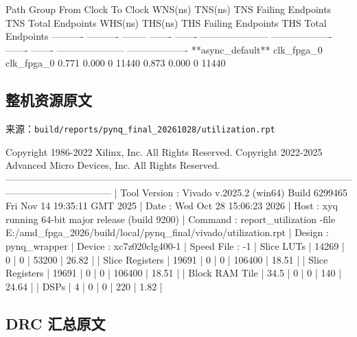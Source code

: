 \begin{codeblock}
Path Group         From Clock         To Clock               WNS(ns)      TNS(ns)  TNS Failing Endpoints  TNS Total Endpoints      WHS(ns)      THS(ns)  THS Failing Endpoints  THS Total Endpoints  
----------         ----------         --------               -------      -------  ---------------------  -------------------      -------      -------  ---------------------  -------------------  
**async_default**  clk_fpga_0         clk_fpga_0               0.771        0.000                      0                11440        0.873        0.000                      0                11440
\end{codeblock}

\Needspace{224pt}

\subsection{整机资源原文}

来源：\texttt{build/\allowbreak{}reports/\allowbreak{}pynq\_\allowbreak{}final\_\allowbreak{}20261028/\allowbreak{}utilization.\allowbreak{}rpt}

\begin{codeblock}[samepage=true]
Copyright 1986-2022 Xilinx, Inc. All Rights Reserved. Copyright 2022-2025 Advanced Micro Devices, Inc. All Rights Reserved.
---------------------------------------------------------------------------------------------------------------------------------------------
| Tool Version : Vivado v.2025.2 (win64) Build 6299465 Fri Nov 14 19:35:11 GMT 2025
| Date         : Wed Oct 28 15:06:23 2026
| Host         : xyq running 64-bit major release  (build 9200)
| Command      : report_utilization -file E:/amd_fpga_2026/build/local/pynq_final/vivado/utilization.rpt
| Design       : pynq_wrapper
| Device       : xc7z020clg400-1
| Speed File   : -1
| Slice LUTs                 | 14269 |     0 |          0 |     53200 | 26.82 |
| Slice Registers            | 19691 |     0 |          0 |    106400 | 18.51 |
| Slice Registers                            | 19691 |     0 |          0 |    106400 | 18.51 |
| Block RAM Tile    | 34.5 |     0 |          0 |       140 | 24.64 |
| DSPs           |    4 |     0 |          0 |       220 |  1.82 |
\end{codeblock}

\Needspace{85pt}

\subsection{DRC 汇总原文}\label{drc-ux6c47ux603bux539fux6587}


